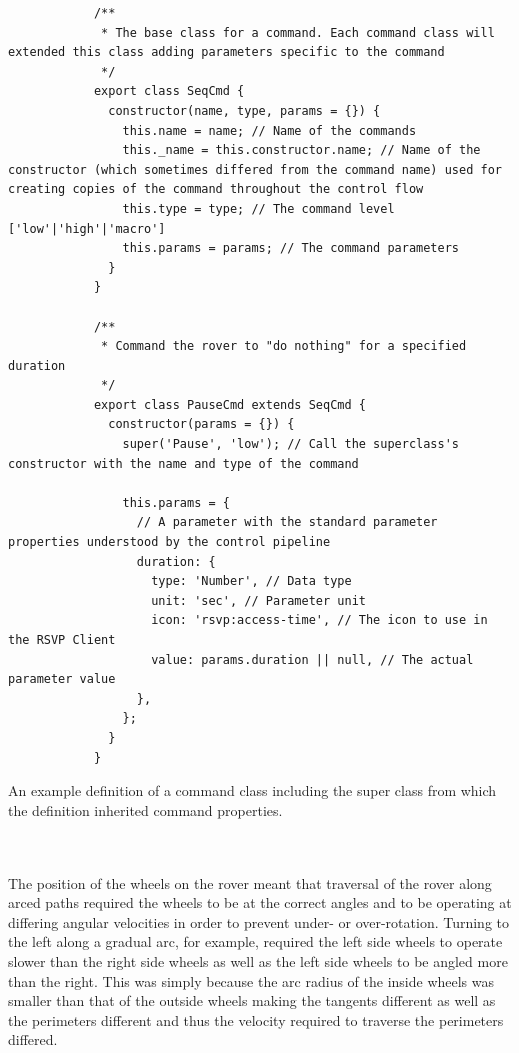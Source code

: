         \begin{code}
          \begin{verbatim}
            /**
             * The base class for a command. Each command class will extended this class adding parameters specific to the command
             */
            export class SeqCmd {
              constructor(name, type, params = {}) {
                this.name = name; // Name of the commands
                this._name = this.constructor.name; // Name of the constructor (which sometimes differed from the command name) used for creating copies of the command throughout the control flow
                this.type = type; // The command level ['low'|'high'|'macro']
                this.params = params; // The command parameters
              }
            }
            
            /**
             * Command the rover to "do nothing" for a specified duration
             */
            export class PauseCmd extends SeqCmd {
              constructor(params = {}) {
                super('Pause', 'low'); // Call the superclass's constructor with the name and type of the command
            
                this.params = {
                  // A parameter with the standard parameter properties understood by the control pipeline
                  duration: {
                    type: 'Number', // Data type
                    unit: 'sec', // Parameter unit
                    icon: 'rsvp:access-time', // The icon to use in the RSVP Client
                    value: params.duration || null, // The actual parameter value
                  },
                };
              }
            }
          \end{verbatim}
          \caption{An example definition of a command class including the super class from which the definition inherited command properties.}
          \label{code:commandDefExample}
        \end{code}
        
        
       \\\\
        The position of the wheels on the rover meant that traversal of the rover along arced paths required the wheels to be at the correct angles and to be operating at differing angular velocities in order to prevent under- or over-rotation. Turning to the left along a gradual arc, for example, required the left side wheels to operate slower than the right side wheels as well as the left side wheels to be angled more than the right. This was simply because the arc radius of the inside wheels was smaller than that of the outside wheels making the tangents different as well as the perimeters different and thus the velocity required to traverse the perimeters differed.
        
